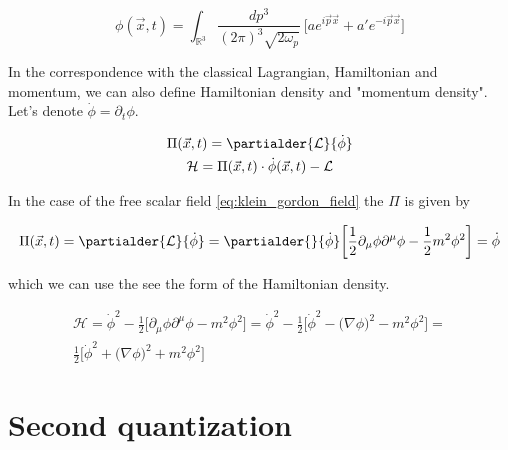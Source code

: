 \begin{equation*}
    \phi (\vec{x}, t) = \int_{\mathbb{R}^{3}} \frac{dp^{3}}{(2 \pi)^{3} \sqrt{2 \omega_{p}}} \ \bigg[a e^{i \vec{p} \vec{x}} + a' e^{- i \vec{p} \vec{x}}\bigg]
\end{equation*}

In the correspondence with the classical Lagrangian, Hamiltonian and momentum, we can also define Hamiltonian density and "momentum density". Let's denote
$\dot{\phi} = \partial_{t} \phi$.

\begin{equation*}
    \begin{gathered}
        \Pi(\vec{x}, t) = \partialder{\mathcal{L}}{\dot{\phi}} \\
        \mathcal{H} = \Pi(\vec{x}, t) \cdot \dot{\phi}(\vec{x}, t) - \mathcal{L}
    \end{gathered}
\end{equation*}

In the case of the free scalar field \ref{eq:klein_gordon_field} the $\Pi$ is given by

\begin{equation*}
    \begin{gathered}
        \Pi(\vec{x}, t) = \partialder{\mathcal{L}}{\dot{\phi}} = \partialder{}{\dot{\phi}} \bigg[\frac{1}{2} \partial_{\mu} \phi \partial^{\mu} \phi - \frac{1}{2} m^{2} \phi^{2}\bigg]
        = \dot{\phi}
    \end{gathered}
\end{equation*}

which we can use the see the form of the Hamiltonian density.

\begin{equation*}
    \begin{gathered}
        \mathcal{H} = \dot{\phi}^{2} - \frac{1}{2}\bigg[\partial_{\mu} \phi \partial^{\mu} \phi - m^{2} \phi^{2}\bigg] = 
        \dot{\phi}^{2} - \frac{1}{2}\bigg[\dot{\phi}^{2} - \big(\nabla \phi\big)^{2} - m^{2} \phi^{2}\bigg] = \\
        \frac{1}{2}\bigg[\dot{\phi}^{2} + \big(\nabla \phi\big)^{2} + m^{2} \phi^{2}\bigg]
    \end{gathered}
\end{equation*}

\section{Second quantization}

